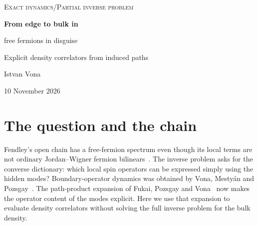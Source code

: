 \documentclass[11pt,a4paper]{article}
\author{Istvan Vona}
\date{10 November 2026}
\begin{document}
\thispagestyle{plain}
\begin{center}
{\small\scshape\color{ink} Exact dynamics\enspace /\enspace Partial inverse problem}\par\vspace{8pt}
{\LARGE\bfseries From edge to bulk in\par free fermions in disguise}\par\vspace{5pt}
{\large Explicit density correlators from induced paths}\par\vspace{7pt}
{\normalsize Istvan Vona}\par\vspace{4pt}
{\small 10 November 2026}
\end{center}
\vspace{-2pt}
\begin{abstract}
A free-fermion spectrum does not by itself determine local spin correlation functions. For the open free-fermions-in-disguise chain, however, each of the first three Hamiltonian terms, and by reflection each of the last three, has an explicitly computable infinite-temperature dynamical correlator with every term in the chain. We derive these correlators in three steps: the end-to-end density correlator, boundary sources coupled to a clique of up to three terms, and a target moved into the bulk. The mechanism is trace orthogonality: two induced-path products survive precisely when their vertex sets differ by the target vertex. At the endpoint this gives one scalar path polynomial; in the bulk only two terminal configurations and three residual interval polynomials are needed. Using unnormalized spectral residues removes all fermion-normalization factors, while a uniform subtraction accounts for stationary source components without casework. The resulting finite double sums require polynomial arithmetic work in system size. The derivation does not reconstruct a generic bulk operator or solve the bulk--bulk inverse problem.
\end{abstract}

\section{The question and the chain}
Fendley's open chain has a free-fermion spectrum even though its local terms are not ordinary Jordan--Wigner fermion bilinears~\cite{Fendley,Elman,Chapman}. The inverse problem asks for the converse dictionary: which local spin operators can be expressed simply using the hidden modes? Boundary-operator dynamics was obtained by Vona, Mesty\'an and Pozsgay~\cite{VMP}. The path-product expansion of Fukai, Pozsgay and Vona~\cite{FPV} now makes the operator content of the modes explicit. Here we use that expansion to evaluate density correlators without solving the full inverse problem for the bulk density.
\end{document}
